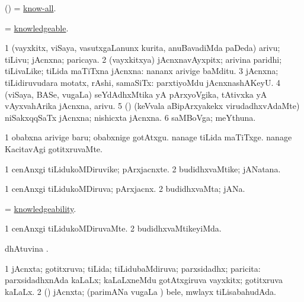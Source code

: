 \bentry
{}
\gl{\nA}
\bmng
(\AmA)  = \hyperlink{know-all}{know-all}. 
\emng
\eentry

\bentry
{}
\gl{\gu}
\bmng
 = \hyperlink{knowledgeable}{knowledgeable}. 
\emng
\eentry

\bentry
{}
\gl{\nA}
\bmng
\bnum
\num{1} (vayxkitx, viSaya, vasutxgaLanunx kurita, anuBavadiMda paDeda) arivu; tiLivu; jAcnxna; paricaya. 
\num{2} (vayxkitxya) jAcnxnavAyxpitx; arivina paridhi; tiLivaLike; tiLida maTiTxna jAcnxna:  nananx arivige baMditu. 
\num{3} jAcnxna; tiLidiruvudara motatx, rAshi, samaSiTx:  parxtiyoMdu jAcnxnashAKeyU. 
\num{4} (viSaya, BASe, \mo vugaLa) seYdAdhxMtika yA pArxyoVgika, tAtivxka yA vAyxvahArika jAcnxna, arivu. 
\num{5} (\tashA) (keVvala aBipArxyakekx virudadhxvAdaMte) niSakxqqSaTx jAcnxna; nishicxta jAcnxna. 
\num{6} saMBoVga; meYthuna. 
\enum
\emng

\noindent
\gl{\nuga}
\bmng
\bnum
\num{1}  obabxna arivige baru; obabxnige gotAtxgu. 
  
\banum
{} nanage tiLida maTiTxge. 
 nanage KacitavAgi gotitxruvaMte. 
\eanum
\numie
\enum
\emng
\eentry

\bentry
{}
\gl{\nA}
\bmng
\bnum
\num{1} cenAnxgi tiLidukoMDiruvike; pArxjacnxte. 
\num{2} budidhxvaMtike; jANatana. 
\enum
\emng
\eentry

\bentry
{}
\gl{\gu}
\bmng
\bnum
\num{1} cenAnxgi tiLidukoMDiruva; pArxjacnx. 
\num{2} budidhxvaMta; jANa. 
\enum
\emng
\eentry

\bentry
{}
\gl{\nA}
\bmng
 = \hyperlink{knowledgeability}{knowledgeability}. 
\emng
\eentry

\bentry
{}
\gl{\kirxvi}
\bmng
\bnum
\num{1} cenAnxgi tiLidukoMDiruvaMte. 
\num{2} budidhxvaMtikeyiMda. 
\enum
\emng
\eentry

\bentry
{}
\gl{\kirx}
\bmng
{} dhAtuvina \BUkaq. 
\emng
\eentry

\bentry
{}
\gl{\gu}
\bmng
\bnum
\num{1} jAcnxta; gotitxruva; tiLida; tiLidubaMdiruva; parxsidadhx; paricita:  parxsidadhxnAda kaLaLx; kaLaLxneMdu gotAtxgiruva vayxkitx; gotitxruva kaLaLx. 
\num{2} (\ga) jAcnxta; (parimANa \mo vugaLa \vi) bele, mwlayx tiLisabahudAda. 
\enum
\emng
\eentry

